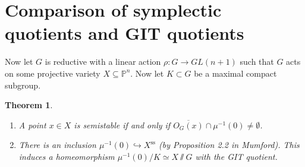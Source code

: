 \documentclass[leqno, openany]{memoir}
\newtheorem{thm}{Theorem}[section]
\theoremstyle{definition}
\theoremstyle{remark}
\theoremstyle{plain}
\theoremstyle{definition}
\theoremstyle{remark}
\renewcommand{\P}{\mathbb{P}}
\newcommand{\mr}[1]{\mathrm{#1}}
\newcommand{\ol}[1]{\overline{#1}}
\begin{document}
\section{Comparison of symplectic quotients and GIT quotients}%
\label{sec:comparison_of_symplectic_quotients_and_git_quotients}

Now let $G$ is reductive with a linear action $\rho \colon G \to GL(n+1)$ such
that $G$ acts on some projective variety $X \subseteq \P^n$. Now let $K \subset
G$ be a maximal compact subgroup. 

\begin{thm} \begin{enumerate} \item A point $x \in X$ is semistable if and only
    if $\ol{O_G(x)} \cap \mu^{-1}(0) \neq \emptyset$.  \item There is an
    inclusion $\mu^{-1}(0) \hookrightarrow X^{\mr{ss}}$ (by Proposition 2.2 in
    Mumford). This induces a homeomorphism $\mu^{-1}(0)/K \simeq X \sslash G$
    with the GIT quotient.  \end{enumerate} \end{thm}
\end{document}
